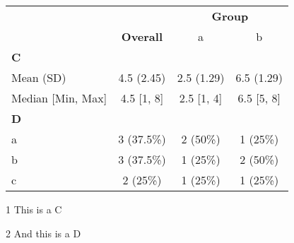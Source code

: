 \documentclass{article}
\begin{document}
\begin{table}[!ht]
\setlength\tabcolsep{0pt}
\centering
\begin{threeparttable}
\begin{tabular*}{\textwidth}{@{\extracolsep{2ex}}*{4}{c}}
 &  & \multicolumn{2}{c}{\textbf{Group\tnote{1}}} \\
\cmidrule{3-4}\cmidrule{3-4}
 & \textbf{Overall} & a & b \\
\multicolumn{1}{l}{\textbf{C\tnote{1}}} &  &  &  \\
\multicolumn{1}{l}{\hspace{1em}Mean (SD)} & 4.5 (2.45) & 2.5 (1.29) & 6.5 (1.29) \\
\multicolumn{1}{l}{\hspace{1em}Median [Min, Max]} & 4.5 [1, 8] & 2.5 [1, 4] & 6.5 [5, 8] \\
\multicolumn{1}{l}{\textbf{D\tnote{2}}} &  &  &  \\
\multicolumn{1}{l}{\hspace{1em}a} & 3 (37.5\%) & 2 (50\%) & 1 (25\%) \\
\multicolumn{1}{l}{\hspace{1em}b} & 3 (37.5\%) & 1 (25\%) & 2 (50\%) \\
\multicolumn{1}{l}{\hspace{1em}c} & 2 (25\%) & 1 (25\%) & 1 (25\%) \\
\end{tabular*}
\begin{tablenotes}
\item[1]This is a C
\item[2]And this is a D
\end{tablenotes}
\end{threeparttable}
\end{table}
\end{document}
